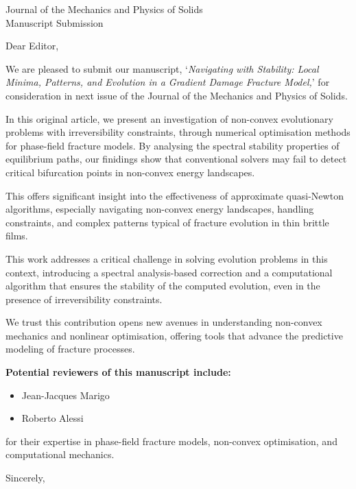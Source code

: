 \documentclass[nofoundrysterling]{cnrsletter} %
\begin{document}
\begin{letter}{
    Journal of the Mechanics and Physics of Solids\\
    Manuscript Submission\\
}

\subject{We Submit an Original Article}  

\opening{Dear Editor,}

We are pleased to submit our manuscript, `\emph{Navigating with Stability: Local Minima, Patterns, and
Evolution in a Gradient Damage Fracture Model,}' for consideration in next issue of the Journal of the Mechanics and Physics of Solids. 

In this original article, we present an investigation of non-convex evolutionary problems with irreversibility constraints, through numerical optimisation methods for phase-field fracture models. By analysing the spectral stability properties of equilibrium paths, our finidings show that conventional solvers may fail to detect critical bifurcation points in non-convex energy landscapes. 

This offers significant insight into the effectiveness of approximate quasi-Newton algorithms, especially navigating non-convex energy landscapes, handling constraints, and complex patterns typical of fracture evolution in thin brittle films. 

This work addresses a critical challenge in solving evolution problems in this context,  introducing a spectral analysis-based correction and a computational algorithm that ensures the stability of the computed evolution, even in the presence of irreversibility constraints. 

We trust this contribution opens new avenues in understanding non-convex mechanics and nonlinear optimisation, offering tools that advance the predictive modeling of fracture processes.

\vspace{4em}

\textbf{Potential reviewers of this manuscript include:}
\begin{itemize}
    \item Jean-Jacques Marigo
    \item Roberto Alessi
\end{itemize}

for their expertise in phase-field fracture models, non-convex optimisation, and computational mechanics.


\closing{Sincerely,} %
\end{letter}
\end{document}
